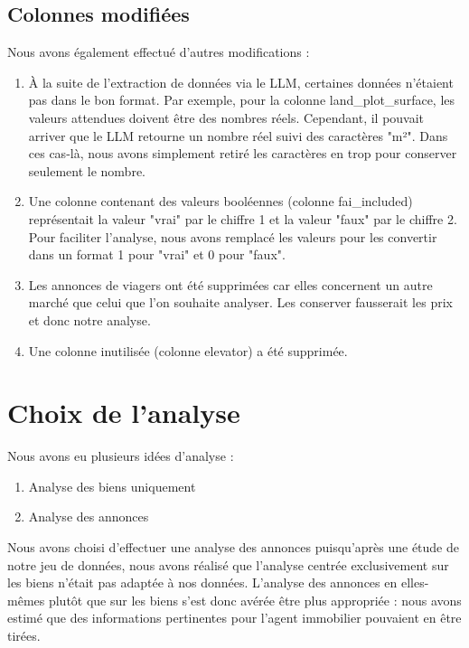 \documentclass[a4paper, 12pt, twoside]{report}
\begin{document}
		\subsection{Colonnes modifiées}

		Nous avons également effectué d'autres modifications :
		\begin{enumerate}
			\item À la suite de l'extraction de données via le LLM, certaines données n'étaient pas dans le bon format. Par exemple, pour la colonne land\_plot\_surface, les valeurs attendues doivent être des nombres réels. Cependant, il pouvait arriver que le LLM retourne un nombre réel suivi des caractères "m²". Dans ces cas-là, nous avons simplement retiré les caractères en trop pour conserver seulement le nombre.
			\item Une colonne contenant des valeurs booléennes (colonne fai\_included) représentait la valeur "vrai" par le chiffre 1 et la valeur "faux" par le chiffre 2. Pour faciliter l'analyse, nous avons remplacé les valeurs pour les convertir dans un format 1 pour "vrai" et 0 pour "faux". 
			\item Les annonces de viagers ont été supprimées car elles concernent un autre marché que celui que l'on souhaite analyser. Les conserver fausserait les prix et donc notre analyse.
			\item Une colonne inutilisée (colonne elevator) a été supprimée.
		\end{enumerate}

	\section{Choix de l’analyse}

	Nous avons eu plusieurs idées d'analyse :
	\begin{enumerate}
		\item Analyse des biens uniquement
		\item Analyse des annonces \\
	\end{enumerate}

	Nous avons choisi d'effectuer une analyse des annonces puisqu'après une étude de notre jeu de données, nous avons réalisé que l’analyse centrée exclusivement sur les biens n’était pas adaptée à nos données. L'analyse des annonces en elles-mêmes plutôt que sur les biens s'est donc avérée être plus appropriée : nous avons estimé que des informations pertinentes pour l'agent immobilier pouvaient en être tirées. \\
\end{document}
